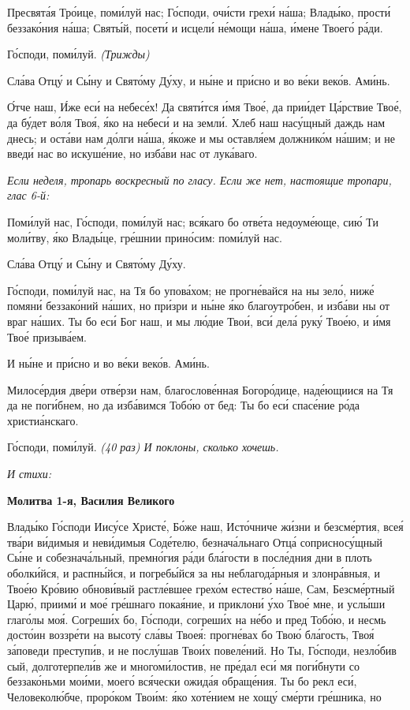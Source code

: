    Пресвята́я Тро́ице, поми́луй нас; Го́споди, очи́сти грехи́ на́ша; Влады́ко,
прости́ беззако́ния на́ша; Святы́й, посети́ и исцели́ не́мощи на́ша, и́мене
Твоего́ ра́ди.


   Го́споди, поми́луй. \itshape (Трижды)\normalfont{}


   Сла́ва Отцу́ и Сы́ну и Свято́му Ду́ху, и ны́не и при́сно и во ве́ки веко́в.
Ами́нь.


   О́тче наш, И́же еси́ на небесе́х! Да святи́тся и́мя Твое́, да прии́дет
Ца́рствие Твое́, да бу́дет во́ля Твоя́, я́ко на небеси́ и на земли́. Хлеб наш
насу́щный даждь нам днесь; и оста́ви нам до́лги на́ша, я́коже и мы оставля́ем
должнико́м на́шим; и не введи́ нас во искуше́ние, но изба́ви нас от
лука́ваго.


 \itshape Если неделя, тропарь воскресный по гласу. Если же нет, настоящие
тропари, глас 6-й:\normalfont{}


   Поми́луй нас, Го́споди, поми́луй нас; вся́каго бо отве́та недоуме́юще, сию́
Ти моли́тву, я́ко Влады́це, гре́шнии прино́сим: поми́луй нас.


   Сла́ва Отцу́ и Сы́ну и Свято́му Ду́ху.


   Го́споди, поми́луй нас, на Тя бо упова́хом; не прогне́вайся на ны зело́,
ниже́ помяни́ беззако́ний на́ших, но при́зри и ны́не я́ко благоутро́бен, и
изба́ви ны от враг на́ших. Ты бо еси́ Бог наш, и мы лю́дие Твои́, вси́ дела́
руку́ Твое́ю, и и́мя Твое́ призыва́ем.



   И ны́не и при́сно и во ве́ки веко́в. Ами́нь.


   Милосе́рдия две́ри отве́рзи нам, благослове́нная Богоро́дице, наде́ющиися
на Тя да не поги́бнем, но да изба́вимся Тобо́ю от бед: Ты бо еси́ спасе́ние
ро́да христиа́нскаго.


   Го́споди, поми́луй. \itshape (40 раз) И поклоны, сколько хочешь.\normalfont{}


 \itshape И стихи:\normalfont{}



 

\bfseries Молитва 1-я, Василия Великого\normalfont{}


   Влады́ко Го́споди Иису́се Христе́, Бо́же наш, Исто́чниче жи́зни и
безсме́ртия, всея́ тва́ри ви́димыя и неви́димыя Соде́телю, безнача́льнаго Отца́
соприсносу́щный Сы́не и собезнача́льный, премно́гия ра́ди бла́гости в
после́дния дни в плоть оболки́йся, и распны́йся, и погребы́йся за ны
неблагода́рныя и злонра́вныя, и Твое́ю Кро́вию обнови́вый растле́вшее
грехо́м естество́ на́ше, Сам, Безсме́ртный Царю́, приими́ и мое́ гре́шнаго
покая́ние, и приклони́ у́хо Твое́ мне, и услы́ши глаго́лы моя́. Согреши́х бо,
Го́споди, согреши́х на не́бо и пред Тобо́ю, и несмь досто́ин воззре́ти на
высоту́ сла́вы Твоея́: прогне́вах бо Твою́ бла́гость, Твоя́ за́поведи
преступи́в, и не послу́шав Твои́х повеле́ний. Но Ты, Го́споди, незло́бив сый,
долготерпели́в же и многоми́лостив, не пре́дал еси́ мя поги́бнути со
беззако́ньми мои́ми, моего́ вся́чески ожида́я обраще́ния. Ты бо рекл еси́,
Человеколю́бче, проро́ком Твои́м: я́ко хоте́нием не хощу́ сме́рти гре́шника, но

